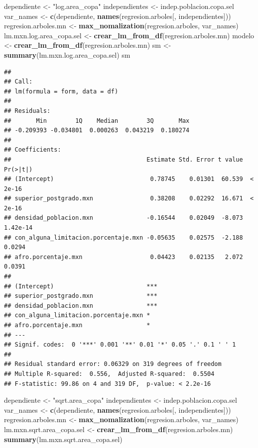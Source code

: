 \documentclass[12pt,]{book}
\newenvironment{Shaded}{\begin{snugshade}}{\end{snugshade}}
\newcommand{\KeywordTok}[1]{\textcolor[rgb]{0.13,0.29,0.53}{\textbf{#1}}}
\newcommand{\StringTok}[1]{\textcolor[rgb]{0.31,0.60,0.02}{#1}}
\newcommand{\NormalTok}[1]{#1}
\begin{document}
\begin{Shaded}
\begin{Highlighting}[]
\NormalTok{dependiente <-}\StringTok{ "log.area_copa"}
\NormalTok{independientes <-}\StringTok{ }\NormalTok{indep.poblacion.copa.sel}
\NormalTok{var_names <-}\StringTok{ }\KeywordTok{c}\NormalTok{(dependiente, }\KeywordTok{names}\NormalTok{(regresion.arboles[, independientes]))}
\NormalTok{regresion.arboles.mn <-}\StringTok{ }\KeywordTok{max_nomalization}\NormalTok{(regresion.arboles, var_names)}
\NormalTok{lm.mxn.log.area_copa.sel <-}\StringTok{ }\KeywordTok{crear_lm_from_df}\NormalTok{(regresion.arboles.mn)}
\NormalTok{modelo <-}\StringTok{ }\KeywordTok{crear_lm_from_df}\NormalTok{(regresion.arboles.mn)}
\NormalTok{sm <-}\StringTok{ }\KeywordTok{summary}\NormalTok{(lm.mxn.log.area_copa.sel)}
\NormalTok{sm}
\end{Highlighting}
\end{Shaded}

\begin{verbatim}
## 
## Call:
## lm(formula = form, data = df)
## 
## Residuals:
##       Min        1Q    Median        3Q       Max 
## -0.209393 -0.034801  0.000263  0.043219  0.180274 
## 
## Coefficients:
##                                      Estimate Std. Error t value Pr(>|t|)
## (Intercept)                           0.78745    0.01301  60.539  < 2e-16
## superior_postgrado.mxn                0.38208    0.02292  16.671  < 2e-16
## densidad_poblacion.mxn               -0.16544    0.02049  -8.073 1.42e-14
## con_alguna_limitacion.porcentaje.mxn -0.05635    0.02575  -2.188   0.0294
## afro.porcentaje.mxn                   0.04423    0.02135   2.072   0.0391
##                                         
## (Intercept)                          ***
## superior_postgrado.mxn               ***
## densidad_poblacion.mxn               ***
## con_alguna_limitacion.porcentaje.mxn *  
## afro.porcentaje.mxn                  *  
## ---
## Signif. codes:  0 '***' 0.001 '**' 0.01 '*' 0.05 '.' 0.1 ' ' 1
## 
## Residual standard error: 0.06329 on 319 degrees of freedom
## Multiple R-squared:  0.556,  Adjusted R-squared:  0.5504 
## F-statistic: 99.86 on 4 and 319 DF,  p-value: < 2.2e-16
\end{verbatim}

\begin{Shaded}
\begin{Highlighting}[]
\NormalTok{dependiente <-}\StringTok{ "sqrt.area_copa"}
\NormalTok{independientes <-}\StringTok{ }\NormalTok{indep.poblacion.copa.sel}
\NormalTok{var_names <-}\StringTok{ }\KeywordTok{c}\NormalTok{(dependiente, }\KeywordTok{names}\NormalTok{(regresion.arboles[, independientes]))}
\NormalTok{regresion.arboles.mn <-}\StringTok{ }\KeywordTok{max_nomalization}\NormalTok{(regresion.arboles, var_names)}
\NormalTok{lm.mxn.sqrt.area_copa.sel <-}\StringTok{ }\KeywordTok{crear_lm_from_df}\NormalTok{(regresion.arboles.mn)}
\KeywordTok{summary}\NormalTok{(lm.mxn.sqrt.area_copa.sel)}
\end{Highlighting}
\end{Shaded}
\end{document}
